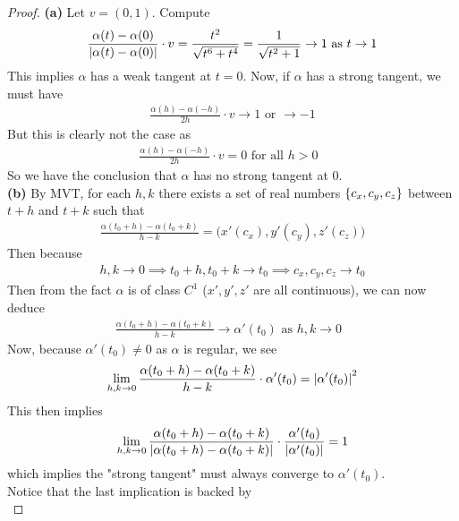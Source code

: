 \documentclass{report}
\begin{document}
\begin{proof}
\textbf{(a)}
Let $v=(0,1)$. Compute 
\begin{align*}
\frac{\alpha (t)-\alpha (0)}{\left|\alpha (t)-\alpha (0)\right|}\cdot v=\frac{t^2}{\sqrt{t^6+t^4} }=\frac{1}{\sqrt{t^2+1} }\to 1\text{ as }t \to 1
\end{align*}
This implies $\alpha $ has a weak tangent at $t=0$. Now, if $\alpha $ has a strong tangent, we must have 
\begin{align*}
\frac{\alpha (h)-\alpha (-h)}{2h}\cdot v \to 1\text{ or }\to -1
\end{align*}
But this is clearly not the case as 
\begin{align*}
\frac{\alpha (h)-\alpha (-h)}{2h}\cdot v=0\text{ for all $h>0$ }
\end{align*}
So we have the conclusion that $\alpha $ has no strong tangent at $0$.\\


\textbf{(b)} 
By MVT, for each $h,k$ there exists a set of real numbers $\{ c_x,c_y,c_z \}$ between $t+h$ and  $t+k$ such that 
 \begin{align*}
\frac{\alpha (t_0+h)-\alpha  (t_0+k)}{h-k}=\Big(x'(c_x),y'(c_y),z'(c_z) \Big)
\end{align*}
Then because 
\begin{align*}
h,k  \to 0 \implies t_0+h ,t_0+k \to t_0 \implies c_x,c_y,c_z \to t_0
\end{align*}
Then from the fact $\alpha $ is of class $C^1$ ($x',y',z'$ are all continuous), we can now deduce 
\begin{align}
\label{ahk}
\frac{\alpha (t_0+h)-\alpha (t_0+k)}{h-k}\to \alpha '(t_0)\text{ as $h,k \to 0$ }
\end{align}
Now, because $\alpha '(t_0)\neq 0$ as $\alpha $ is regular, we see 
\begin{align*}
\lim_{h,k\to 0}\frac{\alpha (t_0+h)-\alpha (t_0+k)}{h-k}\cdot \alpha '(t_0)= \left|\alpha '(t_0)\right|^2
\end{align*}
This then implies 
\begin{align*}
\lim_{h,k\to 0}\frac{\alpha (t_0+h)-\alpha (t_0+k)}{\left|\alpha (t_0+h)-\alpha (t_0+k)\right|}\cdot \frac{\alpha '(t_0)}{\left|\alpha '(t_0)\right|}=1
\end{align*}
which implies the "strong tangent" must always converge to $\alpha '(t_0)$.\\

Notice that the last implication is backed by \\



\end{proof}
\end{document}

